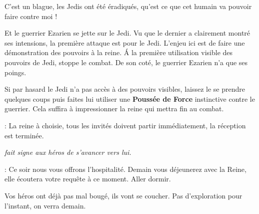 \begin{quotebox}
C’est un blague, les Jedis ont été éradiqués, qu’est ce que cet humain va pouvoir faire contre moi !
\end{quotebox}

Et le guerrier Ezarien se jette sur le Jedi. Vu que le dernier a clairement montré ses intensions, la première attaque est pour le Jedi. L’enjeu ici est de faire une démonstration des pouvoirs à la reine. \'A la première utilisation visible des pouvoirs de Jedi,  stoppe le combat. De son coté, le guerrier Ezarien n’a que ses poings.

Si par hasard le Jedi n’a pas accès à des pouvoirs visibles, laissez le se prendre quelques coups puis faites lui utiliser une \textbf{Poussée de Force} instinctive contre le guerrier. Cela suffira à impressionner la reine qui mettra fin au combat.

\begin{quotebox}
\noindent\textbf{}: La reine à choisie, tous les invités doivent partir immédiatement, la réception est terminée.

\emph{ fait signe aux héros de s’avancer vers lui.}

\noindent\textbf{}: Ce soir nous vous offrons l’hospitalité. Demain vous déjeunerez avec la Reine, elle écoutera votre requête à ce moment. Aller dormir.
\end{quotebox}

Vos héros ont déjà pas mal bougé, ils vont se coucher. Pas d’exploration pour l’instant, on verra demain.